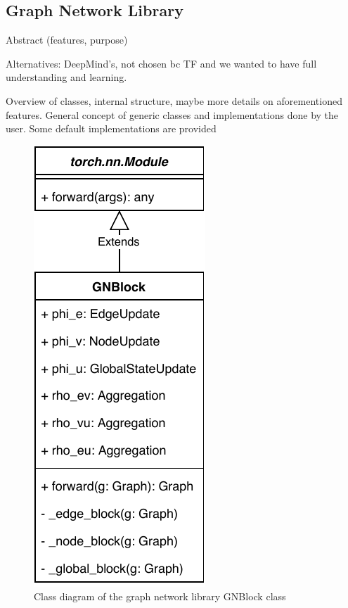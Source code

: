 \subsection{Graph Network Library}

Abstract (features, purpose)

Alternatives: DeepMind's, not chosen bc TF and we wanted to have full understanding and learning.

Overview of classes, internal structure, maybe more details on aforementioned features. General concept of generic classes and implementations done by the user. Some default implementations are provided

\begin{figure}\centering
    \includegraphics[scale=0.65]{resources/graphnets-block}
    \caption{Class diagram of the graph network library GNBlock class}\label{fig:classdiagramgnblock}
\end{figure}

